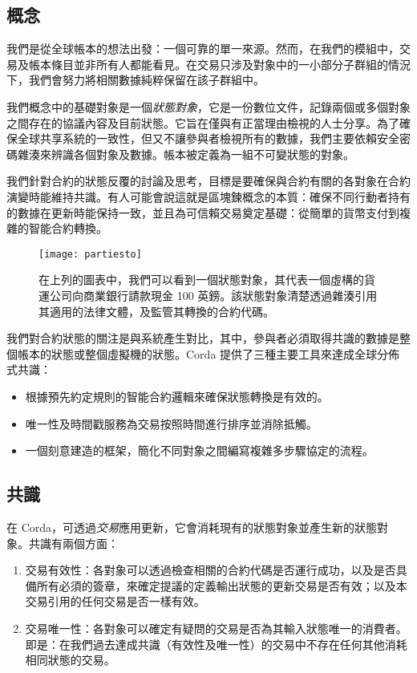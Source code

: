 ﻿\documentclass{article}
\begin{document}
\subsection{概念}
我們是從全球帳本的想法出發：一個可靠的單一來源。然而，在我們的模組中，交易及帳本條目並非所有人都能看見。在交易只涉及對象中的一小部分子群組的情況下，我們會努力將相關數據純粹保留在該子群組中。 

我們概念中的基礎對象是一個\textit{狀態對象}，它是一份數位文件，記錄兩個或多個對象之間存在的協議內容及目前狀態。它旨在僅與有正當理由檢視的人士分享。為了確保全球共享系統的一致性，但又不讓參與者檢視所有的數據，我們主要依賴安全密碼雜湊來辨識各個對象及數據。帳本被定義為一組不可變狀態的對象。

我們針對合約的狀態反覆的討論及思考，目標是要確保與合約有關的各對象在合約演變時能維持共識。有人可能會說這就是區塊鍊概念的本質：確保不同行動者持有的數據在更新時能保持一致，並且為可信賴交易奠定基礎：從簡單的貨幣支付到複雜的智能合約轉換。

\begin{figure}[H]
\texttt{[image: partiesto]}
\caption{在上列的圖表中，我們可以看到一個狀態對象，其代表一個虛構的貨運公司向商業銀行請款現金 100 英鎊。該狀態對象清楚透過雜湊引用其適用的法律文體，及監管其轉換的合約代碼。}
\end{figure}

我們對合約狀態的關注是與系統產生對比，其中，參與者必須取得共識的數據是整個帳本的狀態或整個虛擬機的狀態。Corda 提供了三種主要工具來達成全球分佈式共識：
\begin{itemize}
    \item 根據預先約定規則的智能合約邏輯來確保狀態轉換是有效的。
    \item 唯一性及時間戳服務為交易按照時間進行排序並消除抵觸。
    \item 一個刻意建造的框架，簡化不同對象之間編寫複雜多步驟協定的流程。
    \end{itemize}
    
\subsection{共識}
在 Corda，可透過\textit{交易}應用更新，它會消耗現有的狀態對象並產生新的狀態對象。共識有兩個方面：
\begin{enumerate}
\item{交易有效性：各對象可以透過檢查相關的合約代碼是否運行成功，以及是否具備所有必須的簽章，來確定提議的定義輸出狀態的更新交易是否有效；以及本交易引用的任何交易是否一樣有效。}
\item{交易唯一性：各對象可以確定有疑問的交易是否為其輸入狀態唯一的消費者。即是：在我們過去達成共識（有效性及唯一性）的交易中不存在任何其他消耗相同狀態的交易。}
\end{enumerate}
\end{document}
